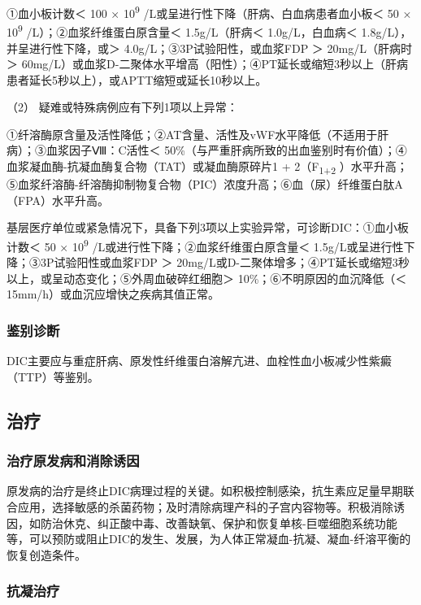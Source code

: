 ①血小板计数＜ 100 × 10\textsuperscript{9}
/L或呈进行性下降（肝病、白血病患者血小板＜ 50 × 10\textsuperscript{9}
/L）；②血浆纤维蛋白原含量＜ 1.5g/L（肝病＜ 1.0g/L，白血病＜
1.8g/L），并呈进行性下降，或＞ 4.0g/L；③3P试验阳性，或血浆FDP ＞
20mg/L（肝病时＞
60mg/L）或血浆D-二聚体水平增高（阳性）；④PT延长或缩短3秒以上（肝病患者延长5秒以上），或APTT缩短或延长10秒以上。

\hypertarget{text00087.htmlux5cux23CHP3-9-2-4-3-2}{}
（2） 疑难或特殊病例应有下列1项以上异常：

①纤溶酶原含量及活性降低；②AT含量、活性及vWF水平降低（不适用于肝病）；③血浆因子Ⅷ：C活性＜
50\%（与严重肝病所致的出血鉴别时有价值）；④血浆凝血酶-抗凝血酶复合物（TAT）或凝血酶原碎片1
+ 2（F\textsubscript{1+2}
）水平升高；⑤血浆纤溶酶-纤溶酶抑制物复合物（PIC）浓度升高；⑥血（尿）纤维蛋白肽A（FPA）水平升高。

基层医疗单位或紧急情况下，具备下列3项以上实验异常，可诊断DIC：①血小板计数＜
50 × 10\textsuperscript{9} /L或进行性下降；②血浆纤维蛋白原含量＜
1.5g/L或呈进行性下降；③3P试验阳性或血浆FDP ＞
20mg/L或D-二聚体增多；④PT延长或缩短3秒以上，或呈动态变化；⑤外周血破碎红细胞＞
10\%；⑥不明原因的血沉降低（＜ 15mm/h）或血沉应增快之疾病其值正常。

\subsubsection{鉴别诊断}

DIC主要应与重症肝病、原发性纤维蛋白溶解亢进、血栓性血小板减少性紫癜（TTP）等鉴别。

\subsection{治疗}

\subsubsection{治疗原发病和消除诱因}

原发病的治疗是终止DIC病理过程的关键。如积极控制感染，抗生素应足量早期联合应用，选择敏感的杀菌药物；及时清除病理产科的子宫内容物等。积极消除诱因，如防治休克、纠正酸中毒、改善缺氧、保护和恢复单核-巨噬细胞系统功能等，可以预防或阻止DIC的发生、发展，为人体正常凝血-抗凝、凝血-纤溶平衡的恢复创造条件。

\subsubsection{抗凝治疗}

